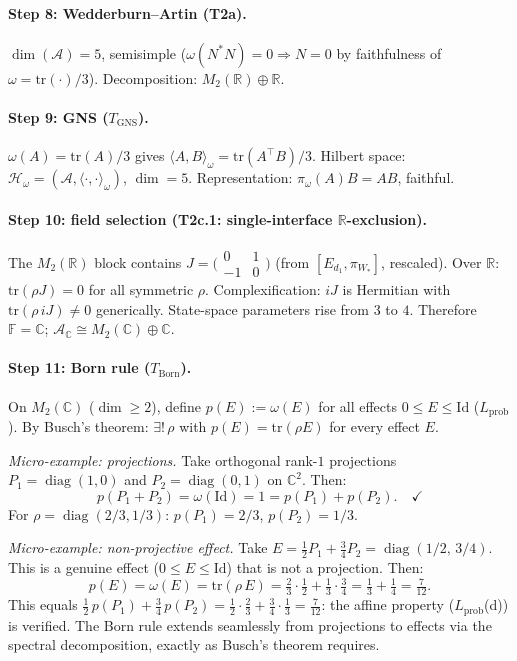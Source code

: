 \documentclass[11pt,a4paper]{article}
\theoremstyle{definition}
\newcommand{\tr}{\mathrm{tr}}
\DeclareMathOperator{\diag}{diag}
\begin{document}
\paragraph{Step 8: Wedderburn--Artin (T2a).}
$\dim(\mathcal{A}) = 5$, semisimple ($\omega(N^*N) = 0 \Rightarrow N = 0$ by faithfulness of $\omega = \tr(\cdot)/3$).  Decomposition: $M_2(\mathbb{R}) \oplus \mathbb{R}$.

\paragraph{Step 9: GNS ($T_{\mathrm{GNS}}$).}
$\omega(A) = \tr(A)/3$ gives $\langle A, B\rangle_\omega = \tr(A^\top B)/3$.  Hilbert space: $\mathcal{H}_\omega = (\mathcal{A}, \langle\cdot,\cdot\rangle_\omega)$, $\dim = 5$.  Representation: $\pi_\omega(A)B = AB$, faithful.

\paragraph{Step 10: field selection (T2c.1: single-interface $\mathbb{R}$-exclusion).}
The $M_2(\mathbb{R})$ block contains $J = \bigl(\begin{smallmatrix} 0 & 1 \\ -1 & 0 \end{smallmatrix}\bigr)$ (from $[E_{d_1}, \pi_{W_*}]$, rescaled).  Over $\mathbb{R}$: $\tr(\rho J) = 0$ for all symmetric $\rho$.  Complexification: $iJ$ is Hermitian with $\tr(\rho\, iJ) \ne 0$ generically.  State-space parameters rise from $3$ to $4$.  Therefore $\mathbb{F} = \mathbb{C}$; $\mathcal{A}_\mathbb{C} \cong M_2(\mathbb{C}) \oplus \mathbb{C}$.

\paragraph{Step 11: Born rule ($T_{\mathrm{Born}}$).}
On $M_2(\mathbb{C})$ ($\dim \ge 2$), define $p(E) := \omega(E)$ for all effects $0 \le E \le \mathrm{Id}$ ($L_{\mathrm{prob}}$).  By Busch's theorem: $\exists!\,\rho$ with $p(E) = \tr(\rho E)$ for every effect $E$.

\smallskip\noindent\textit{Micro-example: projections.}  Take orthogonal rank-$1$ projections $P_1 = \diag(1,0)$ and $P_2 = \diag(0,1)$ on $\mathbb{C}^2$.  Then:
\[
p(P_1 + P_2) = \omega(\mathrm{Id}) = 1 = p(P_1) + p(P_2). \quad\checkmark
\]
For $\rho = \diag(2/3, 1/3)$: $p(P_1) = 2/3$, $p(P_2) = 1/3$.

\smallskip\noindent\textit{Micro-example: non-projective effect.}  Take $E = \tfrac{1}{2}P_1 + \tfrac{3}{4}P_2 = \diag(1/2,\, 3/4)$.  This is a genuine effect ($0 \le E \le \mathrm{Id}$) that is not a projection.  Then:
\[
p(E) = \omega(E) = \tr(\rho\, E) = \tfrac{2}{3}\cdot\tfrac{1}{2} + \tfrac{1}{3}\cdot\tfrac{3}{4} = \tfrac{1}{3} + \tfrac{1}{4} = \tfrac{7}{12}.
\]
This equals $\tfrac{1}{2}\,p(P_1) + \tfrac{3}{4}\,p(P_2) = \tfrac{1}{2}\cdot\tfrac{2}{3} + \tfrac{3}{4}\cdot\tfrac{1}{3} = \tfrac{7}{12}$: the affine property ($L_{\mathrm{prob}}$(d)) is verified.  The Born rule extends seamlessly from projections to effects via the spectral decomposition, exactly as Busch's theorem requires.
\end{document}
